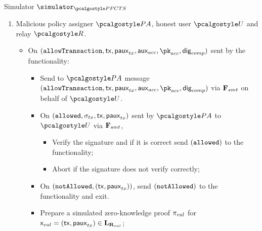 \documentclass[runningheads,10pt]{llncs}
\numberwithin{equation}{section}
\begin{document}
\begin{simbox}{Simulator $\simulator_{\PPCTS}$}
\begin{enumerate}
\begin{itemize}
\begin{itemize}
      \item On $(\notAllowed)$ from $\polas$, send $(\notAllowed)$ to the
          functionality and exit.
      \end{itemize}
    \item On $(\sendTransaction, \ldots)$ from the functionality
      \begin{itemize}
      \item Prepare a simulated zero-knowledge proof $\zkproof_{val}$ for
        $\inp_{val} = (\tx, \paux_{tx}) \in \LAN_{\REL_{val}}$;
      \item Prepare a simulated zero-knowledge proof $\zkproof_{comp}$ for
        $\inp_{comp} = (\tx, \paux_{tx}, \polas, \policydig) \in
        \LAN_{\REL_{comp}}$;
      \item Prepare $\txdata$ and send $(\sendTransaction, \txdata)$ via
        $\func{smt}$ on behalf of $\user$.
      \end{itemize}
    \end{itemize}
  \item Malicious policy assigner $\polas$, honest user $\user$ and relay
  $\relay$.
    \begin{itemize}
    \item On $(\allowTransaction, \tx, \paux_{tx}, \auxacc, \pkacc,
      \policydig)$ sent by the functionality:
      \begin{itemize}
      \item Send to $\polas$ message $(\allowTransaction, \tx, \paux_{tx},
        \auxacc, \pkacc, \policydig)$ via $\func{smt}$ on behalf of $\user$.
      \item On $(\mathtt{allowed}, \sigma_{tx}, \mathsf{tx}, \mathsf{paux}_{tx})$ sent by $\polas$ to
        $\user$ via $\func{smt}$,
        \begin{itemize}
          \item Verify the signature and if it is correct send $(\mathtt{allowed})$ to
            the functionality;
          \item Abort if the signature does not verify correctly;
        \end{itemize}
      \item On $(\mathtt{notAllowed}, (\mathsf{tx}, \mathsf{paux}_{tx}))$, send $(\notAllowed)$ to the
        functionality and exit.
      \item Prepare a simulated zero-knowledge proof $\zkproof_{val}$ for
        $\inp_{val} = (\tx, \paux_{tx}) \in \LAN_{\REL_{val}}$;

\end{itemize}
\end{itemize}
\end{enumerate}
\end{simbox}
\end{document}
